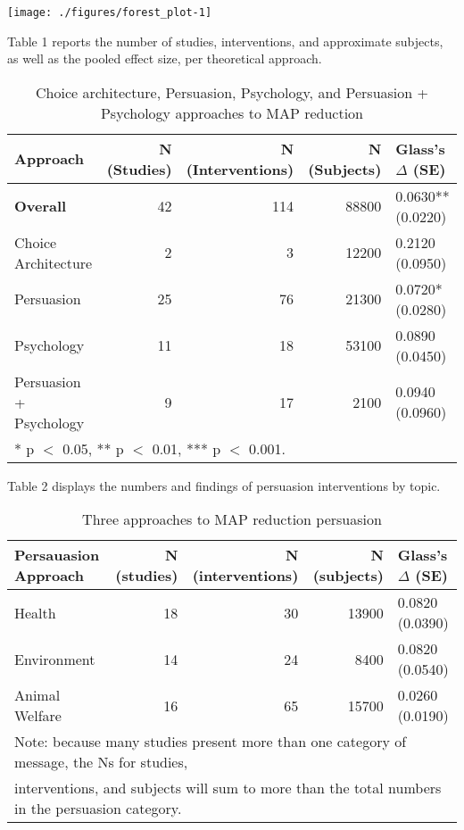 \documentclass[sn-nature,referee,pdflatex]{sn-jnl}
\begin{document}
\texttt{[image: ./figures/forest\_plot-1]}

Table 1 reports the number of studies, interventions, and approximate
subjects, as well as the pooled effect size, per theoretical approach.

\begin{table}[!h]
\centering
\caption{\label{tab:table_one}Choice architecture, Persuasion, Psychology, and Persuasion + Psychology approaches to MAP reduction}
\centering
\begin{tabular}[t]{lrrrl}
\toprule
Approach & N (Studies) & N (Interventions) & N (Subjects) & Glass's $\Delta$ (SE)\\
\midrule
\textbf{Overall} & 42 & 114 & 88800 & 0.0630** (0.0220)\\
Choice Architecture & 2 & 3 & 12200 & 0.2120 (0.0950)\\
Persuasion & 25 & 76 & 21300 & 0.0720* (0.0280)\\
Psychology & 11 & 18 & 53100 & 0.0890 (0.0450)\\
Persuasion + Psychology & 9 & 17 & 2100 & 0.0940 (0.0960)\\
\bottomrule
\multicolumn{5}{l}{\rule{0pt}{1em}* p $<$ 0.05, ** p $<$ 0.01, *** p $<$ 0.001.}\\
\end{tabular}
\end{table}

Table 2 displays the numbers and findings of persuasion interventions by
topic.

\begin{table}[!h]
\centering
\caption{\label{tab:table_two}Three approaches to MAP reduction persuasion}
\centering
\begin{tabular}[t]{lrrrl}
\toprule
Persauasion Approach & N (studies) & N (interventions) & N (subjects) & Glass's $\Delta$ (SE)\\
\midrule
Health & 18 & 30 & 13900 & 0.0820 (0.0390)\\
Environment & 14 & 24 & 8400 & 0.0820 (0.0540)\\
Animal Welfare & 16 & 65 & 15700 & 0.0260 (0.0190)\\
\bottomrule
\multicolumn{5}{l}{\textsuperscript{} Note: because many studies present more than one category of message, the Ns for studies, \linebreak}\\
\multicolumn{5}{l}{interventions, and subjects will sum to more than the total numbers in the persuasion category.}\\
\end{tabular}
\end{table}
\end{document}
